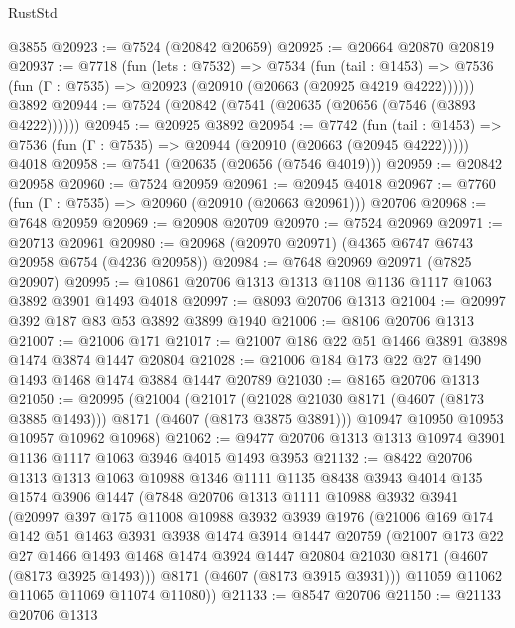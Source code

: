 \begin{lexlean}{RustStd}
\begin{coremodule}
    @3855
@20923 := @7524 (@20842 @20659)
@20925 := @20664 @20870 @20819
@20937 := @7718
    (fun (lets : @7532) =>
    @7534
      (fun (tail : @1453) =>
      @7536 (fun (Γ : @7535) => @20923 (@20910 (@20663 (@20925 @4219 @4222))))))
    @3892
@20944 := @7524 (@20842 (@7541 (@20635 (@20656 (@7546 (@3893 @4222))))))
@20945 := @20925 @3892
@20954 := @7742
    (fun (tail : @1453) => @7536 (fun (Γ : @7535) => @20944 (@20910 (@20663 (@20945 @4222)))))
    @4018
@20958 := @7541 (@20635 (@20656 (@7546 @4019)))
@20959 := @20842 @20958
@20960 := @7524 @20959
@20961 := @20945 @4018
@20967 := @7760 (fun (Γ : @7535) => @20960 (@20910 (@20663 @20961))) @20706
@20968 := @7648 @20959
@20969 := @20908 @20709
@20970 := @7524 @20969
@20971 := @20713 @20961
@20980 := @20968 (@20970 @20971) (@4365 @6747 @6743 @20958 @6754 (@4236 @20958))
@20984 := @7648 @20969 @20971 (@7825 @20907)
@20995 := @10861 @20706 @1313 @1313 @1108 @1136 @1117 @1063 @3892 @3901 @1493 @4018
@20997 := @8093 @20706 @1313
@21004 := @20997 @392 @187 @83 @53 @3892 @3899 @1940
@21006 := @8106 @20706 @1313
@21007 := @21006 @171
@21017 := @21007 @186 @22 @51 @1466 @3891 @3898 @1474 @3874 @1447 @20804
@21028 := @21006 @184 @173 @22 @27 @1490 @1493 @1468 @1474 @3884 @1447 @20789
@21030 := @8165 @20706 @1313
@21050 := @20995
    (@21004
      (@21017 (@21028 @21030 @8171 (@4607 (@8173 @3885 @1493))) @8171 (@4607 (@8173 @3875 @3891)))
      @10947
      @10950
      @10953
      @10957
      @10962
      @10968)
@21062 := @9477 @20706 @1313 @1313 @10974 @3901 @1136 @1117 @1063 @3946 @4015 @1493 @3953
@21132 := @8422
    @20706
    @1313
    @1313
    @1063
    @10988
    @1346
    @1111
    @1135
    @8438
    @3943
    @4014
    @135
    @1574
    @3906
    @1447
    (@7848
      @20706
      @1313
      @1111
      @10988
      @3932
      @3941
      (@20997
        @397
        @175
        @11008
        @10988
        @3932
        @3939
        @1976
        (@21006
          @169
          @174
          @142
          @51
          @1463
          @3931
          @3938
          @1474
          @3914
          @1447
          @20759
          (@21007
            @173
            @22
            @27
            @1466
            @1493
            @1468
            @1474
            @3924
            @1447
            @20804
            @21030
            @8171
            (@4607 (@8173 @3925 @1493)))
          @8171
          (@4607 (@8173 @3915 @3931)))
        @11059
        @11062
        @11065
        @11069
        @11074
        @11080))
@21133 := @8547 @20706
@21150 := @21133
    @20706
    @1313

\end{coremodule}
\end{lexlean}
